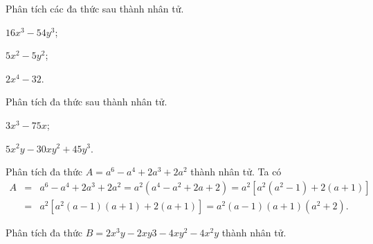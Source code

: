 \begin{vd}
Phân tích các đa thức sau thành nhân tử.
\begin{enumEX}{3}
\item $16x^3-54y^3$;
\item $5x^2-5y^2$;
\item $2x^4-32$.
\end{enumEX}
\end{vd}

\begin{vd}
Phân tích đa thức sau thành nhân tử.
\begin{enumEX}{2}
\item $3x^3-75x$;
\item $5x^2y-30xy^2+45y^3$.
\end{enumEX}
\end{vd}

\begin{vd}
Phân tích đa thức $A= a^6 - a^4 + 2a^3 +2a^2$ thành nhân tử.
\loigiai
{
Ta có 
{\allowdisplaybreaks
\begin{eqnarray*}
A&=&a^6 - a^4 + 2a^3 +2a^2 = a^2 \left( a^4 - a^2 + 2a +2 \right)= a^2 \left[ a^2 \left(a^2 -1 \right) + 2(a + 1) \right]\\
&=& a^2 \left[ a^2 (a - 1) (a + 1) + 2(a + 1) \right]= a^2 (a - 1)(a + 1) \left(a^2 + 2 \right).
\end{eqnarray*}
}
}
\end{vd}

\begin{vd}
Phân tích đa thức $B=2x^3y - 2xy3 - 4xy^2 - 4x^2y$ thành nhân tử.
\end{vd}

